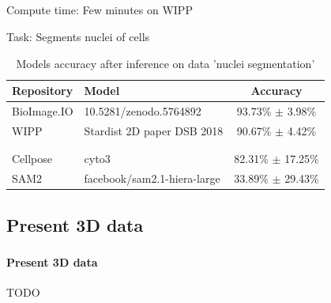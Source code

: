 \subsection{\slidetitle}
\begin{frame}
  \frametitle{\sectiontitle}
  \framesubtitle{\slidetitle}

  Compute time: Few minutes on WIPP

  Task: Segments nuclei of cells

  \begin{center}
    \begin{table}
        \begin{tabular}{|l|l|c|}
            \hline
            \rowcolor{tableFirstRowColor}  Repository   & Model                         & Accuracy \\ [0.5ex]
            \hline
            \cellcolor{tableFirstColColor} BioImage.IO  & 10.5281/zenodo.5764892        & 93.73\% $\pm$ 3.98\% \\
            \hline
            \cellcolor{tableFirstColColor} WIPP         & Stardist 2D paper DSB 2018    & 90.67\% $\pm$ 4.42\% \\
            \hline
            \cellcolor{tableFirstColColor}           &                  &  \\
            \hline
            \cellcolor{tableFirstColColor}           &                  &  \\
            \hline
            \cellcolor{tableFirstColColor} Cellpose     & cyto3                         & 82.31\% $\pm$ 17.25\% \\
            \hline
            \cellcolor{tableFirstColColor} SAM2         & facebook/sam2.1-hiera-large   & 33.89\% $\pm$ 29.43\% \\
            \hline
        \end{tabular}
      \caption{Models accuracy after inference on data 'nuclei segmentation'}
    \end{table}
  \end{center}

\end{frame}

\iffalse
\def\slidetitle{Present 3D data}

\subsection{\slidetitle}
\begin{frame}
  \frametitle{\sectiontitle}
  \framesubtitle{\slidetitle}

  TODO

\end{frame}


